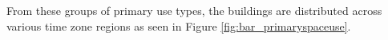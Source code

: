 From these groups of primary use types, the buildings are distributed across various time zone regions as seen in Figure \ref{fig:bar_primaryspaceuse}.